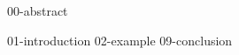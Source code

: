 \documentclass[a4paper,oneside,10pt,ngerman,english]{scrbook}
\begin{document}

{00-abstract}






\cleardoubleoddpage
\tableofcontents





\mainmatter


{01-introduction}
{02-example}
{09-conclusion}

\end{document}
